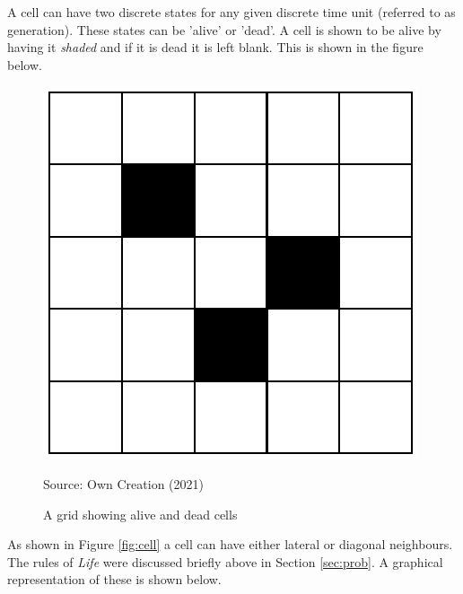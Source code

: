 A cell can have two discrete states for any given discrete time unit (referred to as generation). These states can be 'alive' or 'dead'. A cell is shown to be alive by having it \textsl{shaded} and if it is dead it is left blank.\citep{adamatzky2010game} This is shown in the figure below.
\begin{figure}[H]
\centering
\includegraphics[scale=0.5]{Figures/shaded.png}
\caption{A grid showing alive and dead cells}
\begin{center}
Source: Own Creation (2021)
\end{center}
\end{figure}
As shown in Figure \ref{fig:cell} a cell can have either lateral or diagonal neighbours. The rules of \textsl{Life} were discussed briefly above in Section \ref{sec:prob}. A graphical representation of these is shown below.
